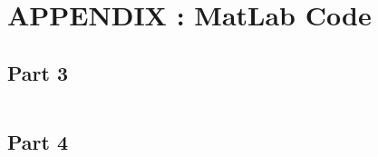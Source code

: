 \documentclass[a4paper]{article}
\begin{document}

\newpage

\appendix
\section*{APPENDIX : MatLab Code}

\subsection*{Part 3}
\inputminted{matlab}{Proba3_complet.m}

\subsection*{Part 4}
\inputminted{matlab}{part4.m}
\end{document}
